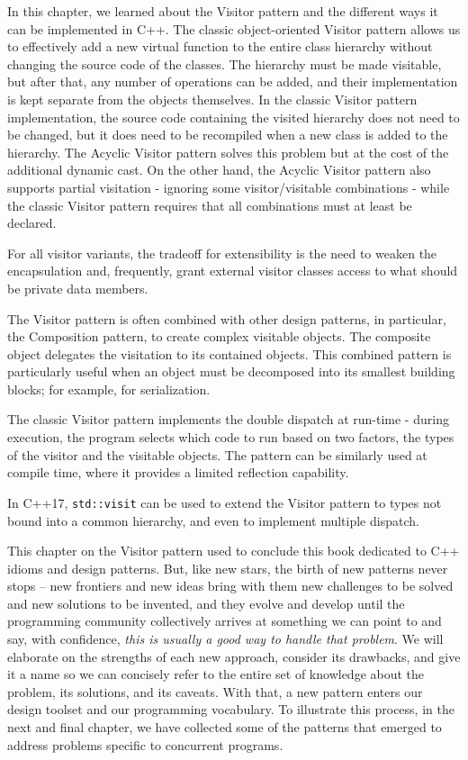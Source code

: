 In this chapter, we learned about the Visitor pattern and the different ways it can be implemented in C++. The classic object-oriented Visitor pattern allows us to effectively add a new virtual function to the entire class hierarchy without changing the source code of the classes. The hierarchy must be made visitable, but after that, any number of operations can be added, and their implementation is kept separate from the objects themselves. In the classic Visitor pattern implementation, the source code containing the visited hierarchy does not need to be changed, but it does need to be recompiled when a new class is added to the hierarchy. The Acyclic Visitor pattern solves this problem but at the cost of the additional dynamic cast. On the other hand, the Acyclic Visitor pattern also supports partial visitation - ignoring some visitor/visitable combinations - while the classic Visitor pattern requires that all combinations must at least be declared.

For all visitor variants, the tradeoff for extensibility is the need to weaken the encapsulation and, frequently, grant external visitor classes access to what should be private data members.

The Visitor pattern is often combined with other design patterns, in particular, the Composition pattern, to create complex visitable objects. The composite object delegates the visitation to its contained objects. This combined pattern is particularly useful when an object must be decomposed into its smallest building blocks; for example, for serialization.

The classic Visitor pattern implements the double dispatch at run-time - during execution, the program selects which code to run based on two factors, the types of the visitor and the visitable objects. The pattern can be similarly used at compile time, where it provides a limited reflection capability.

In C++17, \texttt{std::visit} can be used to extend the Visitor pattern to types not bound into a common hierarchy, and even to implement multiple dispatch.

This chapter on the Visitor pattern used to conclude this book dedicated to C++ idioms and design patterns. But, like new stars, the birth of new patterns never stops -- new frontiers and new ideas bring with them new challenges to be solved and new solutions to be invented, and they evolve and develop until the programming community collectively arrives at something we can point to and say, with confidence, \emph{this is usually a good way to handle that problem}. We will elaborate on the strengths of each new approach, consider its drawbacks, and give it a name so we can concisely refer to the entire set of knowledge about the problem, its solutions, and its caveats. With that, a new pattern enters our design toolset and our programming vocabulary. To illustrate this process, in the next and final chapter, we have collected some of the patterns that emerged to address problems specific to concurrent programs.

